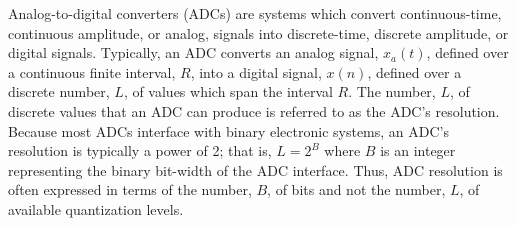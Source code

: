 %
%

Analog-to-digital converters (ADCs) are systems which convert continuous-time, continuous
amplitude, or analog, signals into discrete-time, discrete amplitude, or digital signals.
Typically, an ADC converts an analog signal, $x_a(t)$, defined over a continuous finite
interval, $R$, into a digital signal, $x(n)$, defined over a discrete number, $L$, of
values which span the interval $R$. The number, $L$, of discrete values that an ADC can
produce is referred to as the ADC's resolution. Because most ADCs interface with binary
electronic systems, an ADC's resolution is typically a power of 2; that is, $L=2^B$ where
$B$ is an integer representing the binary bit-width of the ADC interface. Thus, ADC
resolution is often expressed in terms of the number, $B$, of bits and not the number,
$L$, of available quantization levels.

